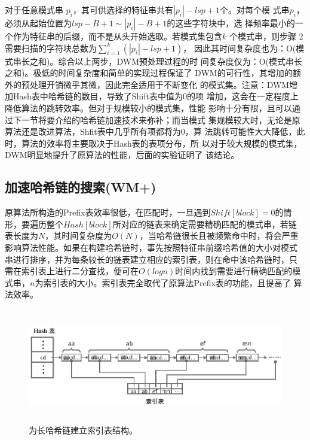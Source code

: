 对于任意模式串 $p_i$，其可供选择的特征串共有$|p_i|-lsp+1$个。对每个模
式串$p_i$，必须从起始位置为$lsp-B+1 \sim |p_i|-B+1$的这些字符块中，选
择频率最小的一个作为特征串的后缀，而不是从头开始选取。若模式集包含$k$
个模式串，则步骤 2需要扫描的字符块总数为$\sum_{i=1}^{k}(|p_i|-lsp+1)$，
因此其时间复杂度也为：O(模式串长之和)。综合以上两步，DWM预处理过程的时
间复杂度仅为：O(模式串长之和)。极低的时间复杂度和简单的实现过程保证了
DWM的可行性，其增加的额外的预处理开销微乎其微，因此完全适用于不断变化
的模式集。注意：DWM增加Hash表中哈希链的数目，导致了Shift表中值为0的项
增加，这会在一定程度上降低算法的跳转效率。但对于规模较小的模式集，性能
影响十分有限，且可以通过下一节将要介绍的哈希链加速技术来弥补；而当模式
集规模较大时，无论是原算法还是改进算法，Shfit表中几乎所有项都将为0，算
法跳转可能性大大降低，此时，算法的效率将主要取决于Hash表的表项分布，所
以对于较大规模的模式集，DWM明显地提升了原算法的性能，后面的实验证明了
该结论。

\subsection{加速哈希链的搜索(WM+)}
\label{sec:5_WM+}

原算法所构造的Prefix表效率很低，在匹配时，一旦遇到$Shift[block]=0$的情
形，要遍历整个$Hash[block]$所对应的链表来确定需要精确匹配的模式串，若链
表长度为$N$，其时间复杂度为$O(N)$，当哈希链很长且被频繁命中时，将会严重
影响算法性能。如果在构建哈希链时，事先按照特征串前缀哈希值的大小对模式
串进行排序，并为每条较长的链表建立相应的索引表，则在命中该哈希链时，只
需在索引表上进行二分查找，便可在$O(logn)$时间内找到需要进行精确匹配的模
式串，$n$为索引表的大小。索引表完全取代了原算法Prefix表的功能，且提高了
算法效率。

\begin{figure}[H]
  \centering
  \includegraphics[height=5cm ,width=12cm]{figures/5_WM/index_table.eps}
  \caption{为长哈希链建立索引表结构。}
  \label{fig:WM_index}
\end{figure}

